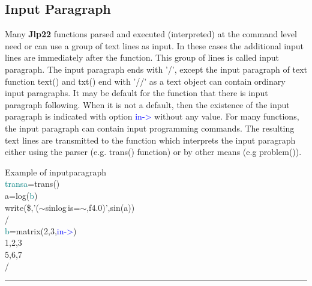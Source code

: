 \subsection{Input Paragraph} 
\label{inpupara} 
Many \textbf{Jlp22} functions parsed and executed (interpreted) at the command level need or can use a group of 
text lines as input. In these cases the additional input lines are immediately after the function. 
This group of lines is called input paragraph. The input paragraph ends with '/', except the 
input paragraph of text function \textcolor{VioletRed}{text}() and \textcolor{VioletRed}{txt}() end with '//' as a text object can contain ordinary input 
paragraphs. It may be default for the function that there is input paragraph following. When 
it is not a default, then the existence of the input paragraph is indicated with option \textcolor{blue}{in->} 
without any value. For many functions, the input paragraph can contain input programming commands. 
The resulting text lines are transmitted to the function which interprets the input paragraph either using 
the parser (e.g. \textcolor{VioletRed}{trans}() function) or by other means (e.g \textcolor{VioletRed}{problem}()). 
\singlespacing 
\begin{example}[inpuparag]Example of inputparagraph\\ 
\label{inpuparag} 
\noindent \textcolor{teal}{transa}=\textcolor{VioletRed}{trans}()\\ 
a=\textcolor{VioletRed}{log}(\textcolor{teal}{b})\\ 
\textcolor{VioletRed}{write}(\$,'($\sim$sinlog\,is=$\sim$,f4.0)',\textcolor{VioletRed}{sin}(a))\\ 
/                                                                                   \\ 
\textcolor{teal}{b}=\textcolor{VioletRed}{matrix}(2,3,\textcolor{blue}{in->})\\ 
1,2,3\\ 
5,6,7\\ 
/    \\ 
\end{example} 
\vspace{-7mm} \rule{5cm}{0.1pt} 
\onehalfspacing 
